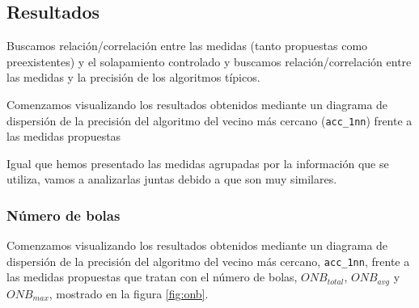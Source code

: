 \documentclass[a4paper,12pt]{report}
\theoremstyle{definition}
\begin{document}
\subsection{Resultados}
Buscamos relación/correlación entre las medidas (tanto propuestas como preexistentes) y el solapamiento controlado y buscamos relación/correlación entre las medidas y la precisión de los algoritmos típicos.

Comenzamos visualizando los resultados obtenidos mediante un diagrama de dispersión de la precisión del algoritmo del vecino más cercano (\texttt{acc\_1nn}) frente a las medidas propuestas

Igual que hemos presentado las medidas agrupadas por la información que se utiliza, vamos a analizarlas juntas debido a que son muy similares.

\subsubsection{Número de bolas}

Comenzamos visualizando los resultados obtenidos mediante un diagrama de dispersión de la precisión del algoritmo del vecino más cercano, \texttt{acc\_1nn}, frente a las medidas propuestas que tratan con el número de bolas, $ONB_{total}$, $ONB_{avg}$ y $ONB_{max}$, mostrado en la figura \ref{fig:onb}.
\end{document}
